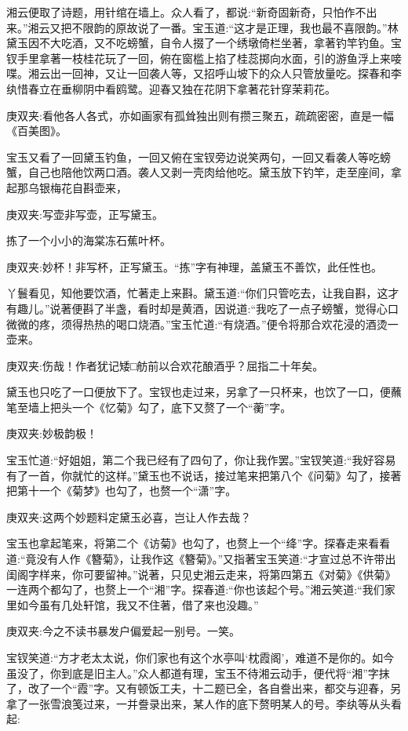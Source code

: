 \begin{parag}
    湘云便取了诗题，用针绾在墙上。众人看了，都说:“新奇固新奇，只怕作不出来。”湘云又把不限韵的原故说了一番。宝玉道:“这才是正理，我也最不喜限韵。”林黛玉因不大吃酒，又不吃螃蟹，自令人掇了一个绣墩倚栏坐著，拿著钓竿钓鱼。宝钗手里拿著一枝桂花玩了一回，俯在窗槛上掐了桂蕊掷向水面，引的游鱼浮上来唼喋。湘云出一回神，又让一回袭人等，又招呼山坡下的众人只管放量吃。探春和李纨惜春立在垂柳阴中看鸥鹭。迎春又独在花阴下拿著花针穿茉莉花。\begin{note}庚双夹:看他各人各式，亦如画家有孤耸独出则有攒三聚五，疏疏密密，直是一幅《百美图》。\end{note}宝玉又看了一回黛玉钓鱼，一回又俯在宝钗旁边说笑两句，一回又看袭人等吃螃蟹，自己也陪他饮两口酒。袭人又剥一壳肉给他吃。黛玉放下钓竿，走至座间，拿起那乌银梅花自斟壶来，\begin{note}庚双夹:写壶非写壶，正写黛玉。\end{note}拣了一个小小的海棠冻石蕉叶杯。\begin{note}庚双夹:妙杯！非写杯，正写黛玉。“拣”字有神理，盖黛玉不善饮，此任性也。\end{note}丫鬟看见，知他要饮酒，忙著走上来斟。黛玉道:“你们只管吃去，让我自斟，这才有趣儿。”说著便斟了半盏，看时却是黄酒，因说道:“我吃了一点子螃蟹，觉得心口微微的疼，须得热热的喝口烧酒。”宝玉忙道:“有烧酒。”便令将那合欢花浸的酒烫一壶来。\begin{note}庚双夹:伤哉！作者犹记矮□舫前以合欢花酿酒乎？屈指二十年矣。\end{note}黛玉也只吃了一口便放下了。宝钗也走过来，另拿了一只杯来，也饮了一口，便蘸笔至墙上把头一个《忆菊》勾了，底下又赘了一个“蘅”字。\begin{note}庚双夹:妙极韵极！\end{note}宝玉忙道:“好姐姐，第二个我已经有了四句了，你让我作罢。”宝钗笑道:“我好容易有了一首，你就忙的这样。”黛玉也不说话，接过笔来把第八个《问菊》勾了，接著把第十一个《菊梦》也勾了，也赘一个“潇”字。\begin{note}庚双夹:这两个妙题料定黛玉必喜，岂让人作去哉？\end{note}宝玉也拿起笔来，将第二个《访菊》也勾了，也赘上一个“绛”字。探春走来看看道:“竟没有人作《簪菊》，让我作这《簪菊》。”又指著宝玉笑道:“才宣过总不许带出闺阁字样来，你可要留神。”说著，只见史湘云走来，将第四第五《对菊》《供菊》一连两个都勾了，也赘上一个“湘”字。探春道:“你也该起个号。”湘云笑道:“我们家里如今虽有几处轩馆，我又不住著，借了来也没趣。”\begin{note}庚双夹:今之不读书暴发户偏爱起一别号。一笑。\end{note}宝钗笑道:“方才老太太说，你们家也有这个水亭叫‘枕霞阁’，难道不是你的。如今虽没了，你到底是旧主人。”众人都道有理，宝玉不待湘云动手，便代将“湘”字抹了，改了一个“霞”字。又有顿饭工夫，十二题已全，各自誊出来，都交与迎春，另拿了一张雪浪笺过来，一并誊录出来，某人作的底下赘明某人的号。李纨等从头看起:
\end{parag}


